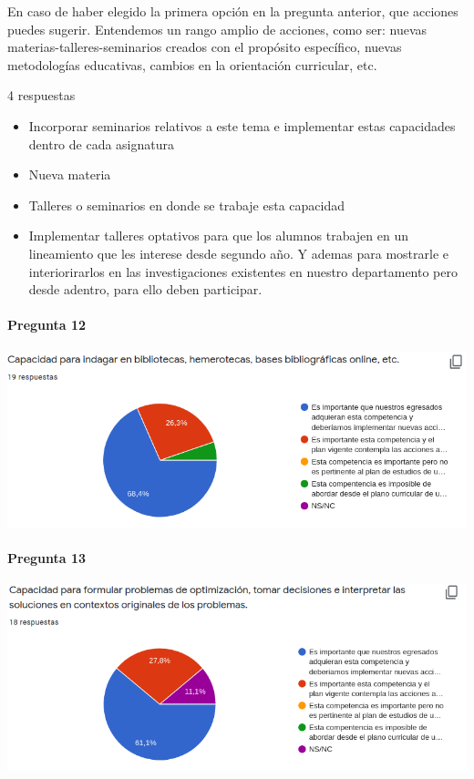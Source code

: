\documentclass[a4paper,10pt,BCOR10mm,oneside,headsepline]{scrbook}
\begin{document}
\begin{subappendices}
 En caso de haber elegido la primera opción en la pregunta anterior, que acciones puedes sugerir. Entendemos un rango amplio de acciones, como ser: nuevas materias-talleres-seminarios creados con el propósito específico, nuevas metodologías educativas, cambios en la orientación curricular, etc. 
 
 4 respuestas
 
 \begin{itemize}
  \item Incorporar seminarios relativos a este tema e implementar estas capacidades dentro de cada asignatura
\item Nueva materia

\item Talleres o seminarios en donde se trabaje esta capacidad
\item Implementar talleres optativos para que los alumnos trabajen en un lineamiento que les interese desde segundo año. Y ademas para mostrarle e interiorirarlos en las investigaciones existentes en nuestro departamento pero desde adentro, para ello deben participar.
 \end{itemize}


 
  \paragraph{Pregunta 12}
\begin{center}
 
\includegraphics[scale=.9]{doc12.png}
 \end{center}
 
  
  \paragraph{Pregunta 13}
\begin{center}
 
\includegraphics[scale=.9]{doc13.png}
 \end{center}
 

\end{subappendices}
\end{document}
